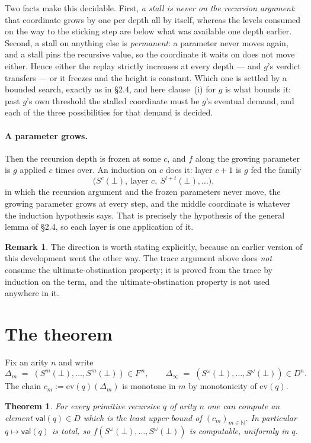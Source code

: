 \documentclass[11pt]{article}
\newcommand{\ev}{\mathrm{ev}}
\newcommand{\val}{\mathsf{val}}
\newcommand{\Sw}{S^{\omega}(\bot)}
\newcommand{\N}{\mathbb{N}}
\newcommand{\D}{D}
\newcommand{\Fin}{F}
\newtheorem{theorem}{Theorem}
\theoremstyle{definition}
\newtheorem{remark}{Remark}
\begin{document}
Two facts make this decidable. First, \emph{a stall is never on the
recursion argument}: that coordinate grows by one per depth all by itself,
whereas the levels consumed on the way to the sticking step are below what
was available one depth earlier. Second, a stall on anything else is
\emph{permanent}: a parameter never moves again, and a stall pins the
recursive value, so the coordinate it waits on does not move either. Hence
either the replay strictly increases at every depth --- and $g$'s verdict
transfers --- or it freezes and the height is constant. Which one is
settled by a bounded search, exactly as in \S2.4, and here clause~(i) for
$g$ is what bounds it: past $g$'s own threshold the stalled coordinate
must be $g$'s eventual demand, and each of the three possibilities for
that demand is decided.

\paragraph{A parameter grows.} Then the recursion depth is frozen at some
$c$, and $f$ along the growing parameter is $g$ applied $c$ times over. An
induction on $c$ does it: layer $c+1$ is $g$ fed the family
\[
\bigl(S^{c}(\bot),\ \text{layer } c,\ S^{l+t}(\bot),\dots\bigr),
\]
in which the recursion argument and the frozen parameters never move, the
growing parameter grows at every step, and the middle coordinate is
whatever the induction hypothesis says. That is precisely the hypothesis
of the general lemma of \S2.4, so each layer is one application of it.

\begin{remark}
The direction is worth stating explicitly, because an earlier version of
this development went the other way. The trace argument above does
\emph{not} consume the ultimate-obstination property; it is proved from
the trace by induction on the term, and the ultimate-obstination property
is not used anywhere in it.
\end{remark}

\section{The theorem}

Fix an arity $n$ and write
\[
\Delta_m \;=\; (S^m(\bot),\dots,S^m(\bot)) \in \Fin^{\,n},
\qquad
\Delta_\infty \;=\; (\Sw,\dots,\Sw) \in \D^n .
\]
The chain $c_m := \ev(q)(\Delta_m)$ is monotone in $m$ by monotonicity of
$\ev(q)$.

\begin{theorem}
\label{thm:main}
For every primitive recursive $q$ of arity $n$ one can compute an element
$\val(q) \in \D$ which is the least upper bound of $(c_m)_{m\in\N}$. In
particular $q \mapsto \val(q)$ is total, so $f(\Sw,\dots,\Sw)$ is
computable, uniformly in $q$.
\end{theorem}
\end{document}

